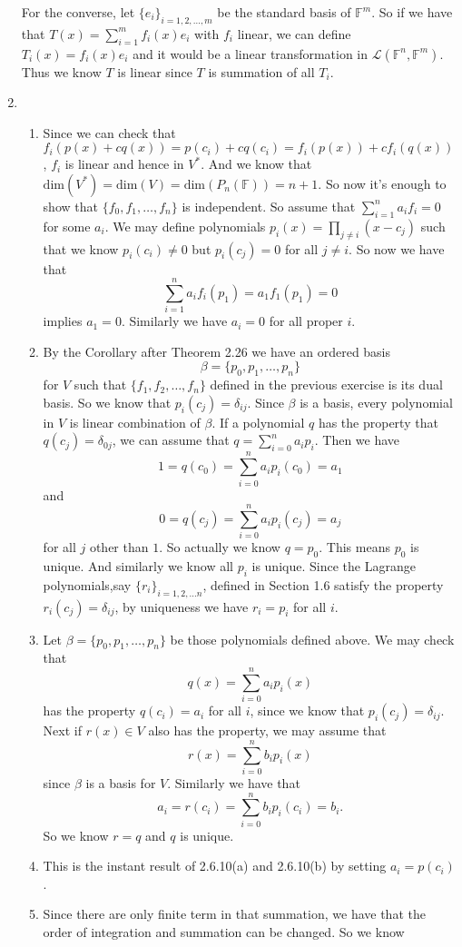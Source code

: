\begin{enumerate}
For the converse, let $\{e_i\}_{i=1,2,\ldots ,m}$ be the standard basis of $\mathbb{F}^m$. So if we have that $T(x)=\sum_{i=1}^m{f_i(x)e_i}$ with $f_i$ linear, we can define $T_i(x)=f_i(x)e_i$ and it would be a linear transformation in $\mathscr{L}(\mathbb{F}^n,\mathbb{F}^m)$. Thus we know $T$ is linear since $T$ is summation of all $T_i$.
\item \begin{enumerate}
\item Since we can check that $f_i(p(x)+cq(x))=p(c_i)+cq(c_i)=f_i(p(x))+cf_i(q(x))$, $f_i$ is linear and hence in $V^*$. And we know that $\mathrm{dim}(V^*)=\mathrm{dim}(V)=\mathrm{dim}(P_n(\mathbb{F}))=n+1$. So now it's enough to show that $\{f_0,f_1,\ldots ,f_n\}$ is independent. So assume that $\sum_{i=1}^n{a_if_i}=0$ for some $a_i$. We may define polynomials $p_i(x)=\prod_{j\neq i}{(x-c_j)}$ such that we know $p_i(c_i)\neq 0$ but $p_i(c_j)=0$ for all $j\neq i$. So now we have that 
\[\sum_{i=1}^n{a_if_i(p_1)}=a_1f_1(p_1)=0\]
implies $a_1=0$. Similarly we have $a_i=0$ for all proper $i$.
\item By the Corollary after Theorem 2.26 we have an ordered basis 
\[\beta =\{p_0,p_1,\ldots ,p_n\}\] for $V$ such that $\{f_1,f_2,\ldots ,f_n\}$ defined in the previous exercise is its dual basis. So we know that $p_i(c_j)=\delta_{ij}$. Since $\beta $ is a basis, every polynomial in $V$ is linear combination of $\beta $. If a polynomial $q$ has the property that $q(c_j)=\delta_{0j}$, we can assume that $q=\sum_{i=0}^n{a_ip_i}$. Then we have 
\[1=q(c_0)=\sum_{i=0}^n{a_ip_i(c_0)}=a_1\]
and 
\[0=q(c_j)=\sum_{i=0}^n{a_ip_i(c_j)}=a_j\]
for all $j$ other than $1$. So actually we know $q=p_0$. This means $p_0$ is unique. And similarly we know all $p_i$ is unique. Since the Lagrange polynomials,say $\{r_i\}_{i=1,2,\ldots n}$, defined in Section 1.6 satisfy the property $r_i(c_j)=\delta_{ij}$, by uniqueness we have $r_i=p_i$ for all $i$.
\item Let $\beta =\{p_0,p_1,\ldots ,p_n\}$ be those polynomials defined above. We may check that 
\[q(x)=\sum_{i=0}^n{a_ip_i(x)}\]
has the property $q(c_i)=a_i$ for all $i$, since we know that $p_i(c_j)=\delta_{ij}$. Next if $r(x)\in V$ also has the property, we may assume that 
\[r(x)=\sum_{i=0}^n{b_ip_i(x)}\]
since $\beta $ is a basis for $V$. Similarly we have that 
\[a_i=r(c_i)=\sum_{i=0}^n{b_ip_i(c_i)=b_i}.\]
So we know $r=q$ and $q$ is unique.
\item This is the instant result of 2.6.10(a) and 2.6.10(b) by setting $a_i=p(c_i)$.
\item Since there are only finite term in that summation, we have that the order of integration and summation can be changed. So we know 

\end{enumerate}
\end{enumerate}

